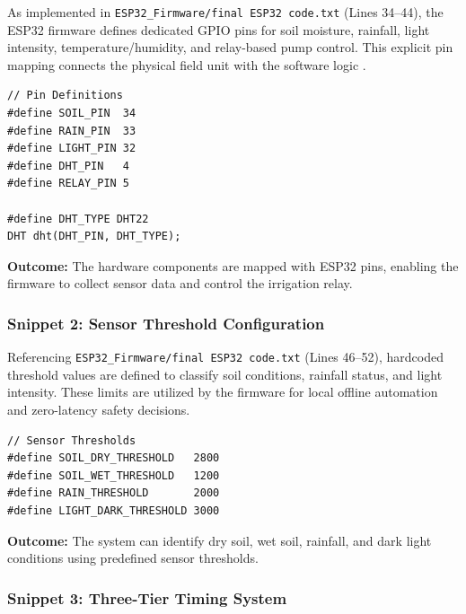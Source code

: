 As implemented in \texttt{ESP32\_Firmware/final ESP32 code.txt} (Lines 34--44), the ESP32 firmware defines dedicated GPIO pins for soil moisture, 
rainfall, light intensity, temperature/humidity, and relay-based 
pump control. This explicit pin mapping connects the physical field unit 
with the software logic \cite{raj2021survey}.

\begin{lstlisting}
// Pin Definitions
#define SOIL_PIN  34
#define RAIN_PIN  33
#define LIGHT_PIN 32
#define DHT_PIN   4
#define RELAY_PIN 5

#define DHT_TYPE DHT22
DHT dht(DHT_PIN, DHT_TYPE);
\end{lstlisting}

\textbf{Outcome:} The hardware components are mapped with ESP32 
pins, enabling the firmware to collect sensor data and control the 
irrigation relay.

\subsubsection{Snippet 2: Sensor Threshold Configuration}
\label{subsec:snippet2}

Referencing \texttt{ESP32\_Firmware/final ESP32 code.txt} (Lines 46--52), hardcoded threshold values are defined to classify soil conditions, rainfall 
status, and light intensity. These limits are utilized by the firmware 
for local offline automation and zero-latency safety decisions.

\begin{lstlisting}
// Sensor Thresholds
#define SOIL_DRY_THRESHOLD   2800
#define SOIL_WET_THRESHOLD   1200
#define RAIN_THRESHOLD       2000
#define LIGHT_DARK_THRESHOLD 3000
\end{lstlisting}

\textbf{Outcome:} The system can identify dry soil, wet soil, 
rainfall, and dark light conditions using predefined sensor 
thresholds.

\subsubsection{Snippet 3: Three-Tier Timing System}
\label{subsec:snippet3}

